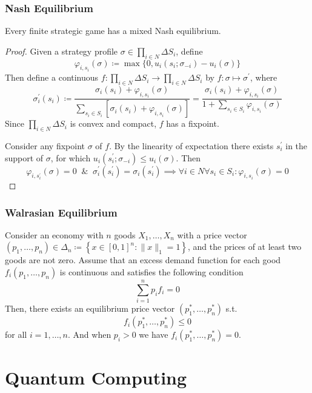 \documentclass[UTF8,11pt,colorlinks,compress,openany]{beamer}%
\begin{document}
\begin{frame}\frametitle{Nash Equilibrium}
\setlength\abovedisplayskip{0pt}
\setlength\belowdisplayskip{0pt}
\begin{theorem}
	Every finite strategic game has a mixed Nash equilibrium.
\end{theorem}
\begin{proof}
	Given a strategy profile $\sigma\in\prod\limits_{i\in N}\Delta S_i$, define
	\[\varphi_{i,s_i}(\sigma)\coloneqq \max\big\{0,u_i(s_i;\sigma_{-i})-u_i(\sigma)\big\}\]
	Then define a continuous $f: \prod\limits_{i\in N}\Delta S_i\to\prod\limits_{i\in N}\Delta S_i$ by $f: \sigma\mapsto\sigma^\prime$, where
	\[
	\sigma_i^\prime(s_i)\coloneqq \dfrac{\sigma_i(s_i)+\varphi_{i,s_i}(\sigma)}{\sum\limits_{s_i\in S_i}\left[\sigma_i(s_i)+\varphi_{i,s_i}(\sigma)\right]}=\dfrac{\sigma_i(s_i)+\varphi_{i,s_i}(\sigma)}{1+\sum\limits_{s_i\in S_i}\varphi_{i,s_i}(\sigma)}
	\]
	Since $\prod\limits_{i\in N}\Delta S_i$ is convex and compact, $f$ has a fixpoint.

	Consider any fixpoint $\sigma$ of $f$. By the linearity of expectation there exists $s_i^\prime$ in the support of $\sigma$, for which $u_i(s_i^\prime;\sigma_{-i})\leq u_i(\sigma)$. Then
	\[\varphi_{i,s_i^\prime}(\sigma)=0\;\;\&\;\;\sigma_i^\prime(s_i^\prime)=\sigma_i(s_i^\prime)\implies\forall i\in N\forall s_i\in S_i: \varphi_{i,s_i}(\sigma)=0\]
\end{proof}
\end{frame}

\begin{frame}\frametitle{Walrasian Equilibrium}
\begin{theorem}
Consider an economy with $n$ goods $X_1,\dots, X_n$ with a price vector $(p_1,\dots, p_n)\in\Delta_n\coloneqq \left\{x\in[0,1]^n:\|x\|_1=1\right\}$, and the prices of at least two goods are not zero. Assume that an excess demand function for each good $f_i(p_1,\dots, p_n)$ is continuous and satisfies the following condition
\[\sum\limits_{i=1}^n p_if_i=0\tag{Walras Law}\]
Then, there exists an equilibrium price vector $(p_1^*,\dots,p_n^*)$ s.t.
\[f_i(p_1^*,\dots,p_n^*)\leq 0\]
for all $i=1,\dots,n$. And when $p_i>0$ we have $f_i(p_1^*,\dots,p_n^*)=0$.
\end{theorem}
\end{frame}


\section{Quantum Computing}
\end{document}
